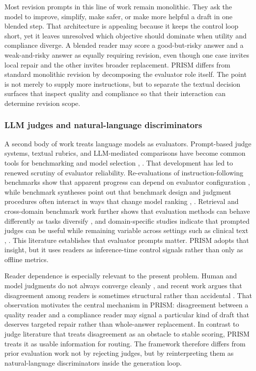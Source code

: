 \documentclass{article}
\begin{document}
Most revision prompts in this line of work remain monolithic. They ask the model to improve, simplify, make safer, or make more helpful a draft in one blended step. That architecture is appealing because it keeps the control loop short, yet it leaves unresolved which objective should dominate when utility and compliance diverge. A blended reader may score a good-but-risky answer and a weak-and-risky answer as equally requiring revision, even though one case invites local repair and the other invites broader replacement. PRISM differs from standard monolithic revision by decomposing the evaluator role itself. The point is not merely to supply more instructions, but to separate the textual decision surfaces that inspect quality and compliance so that their interaction can determine revision scope.

\subsubsection{LLM judges and natural-language discriminators}

\label{sec:llm_judges_and_natural_language_discrimi}

A second body of work treats language models as evaluators. Prompt-based judge systems, textual rubrics, and LLM-mediated comparisons have become common tools for benchmarking and model selection \cite{zhang2024evaluation}, \cite{li2025unieval}. That development has led to renewed scrutiny of evaluator reliability. Re-evaluations of instruction-following benchmarks show that apparent progress can depend on evaluator configuration \cite{liu2024reife}, while benchmark syntheses point out that benchmark design and judgment procedures often interact in ways that change model ranking \cite{cao2024comprehensive}, \cite{sun2024rapidly}. Retrieval and cross-domain benchmark work further shows that evaluation methods can behave differently as tasks diversify \cite{thakur2021beir}, and domain-specific studies indicate that prompted judges can be useful while remaining variable across settings such as clinical text \cite{richterpechanski2024clinical}, \cite{labrak2023zeroshot}. This literature establishes that evaluator prompts matter. PRISM adopts that insight, but it uses readers as inference-time control signals rather than only as offline metrics.

Reader dependence is especially relevant to the present problem. Human and model judgments do not always converge cleanly \cite{guo2023close}, and recent work argues that disagreement among readers is sometimes structural rather than accidental \cite{marco2025reader}. That observation motivates the central mechanism in PRISM: disagreement between a quality reader and a compliance reader may signal a particular kind of draft that deserves targeted repair rather than whole-answer replacement. In contrast to judge literature that treats disagreement as an obstacle to stable scoring, PRISM treats it as usable information for routing. The framework therefore differs from prior evaluation work not by rejecting judges, but by reinterpreting them as natural-language discriminators inside the generation loop.
\end{document}
